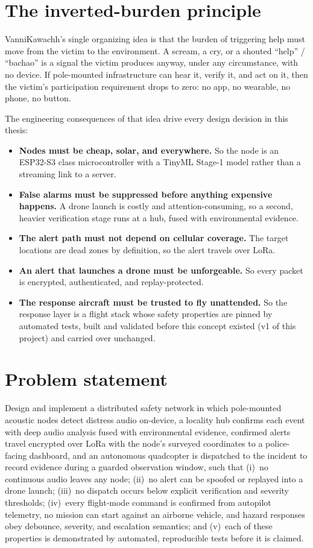 \documentclass[12pt,a4paper]{report}
\begin{document}
\section{The inverted-burden principle}
\label{sec:inverted}

VanniKawachh's single organizing idea is that the burden of triggering
help must move from the victim to the environment. A scream, a cry, or
a shouted ``help'' / ``bachao'' is a signal the victim produces
anyway, under any circumstance, with no device. If pole-mounted
infrastructure can hear it, verify it, and act on it, then the
victim's participation requirement drops to zero: no app, no
wearable, no phone, no button.

The engineering consequences of that idea drive every design decision
in this thesis:
\begin{itemize}
\item \textbf{Nodes must be cheap, solar, and everywhere.} So the
  node is an ESP32-S3 class microcontroller with a TinyML Stage-1
  model rather than a streaming link to a server.
\item \textbf{False alarms must be suppressed before anything
  expensive happens.} A drone launch is costly and
  attention-consuming, so a second, heavier verification stage runs
  at a hub, fused with environmental evidence.
\item \textbf{The alert path must not depend on cellular coverage.}
  The target locations are dead zones by definition, so the alert
  travels over LoRa.
\item \textbf{An alert that launches a drone must be unforgeable.} So
  every packet is encrypted, authenticated, and replay-protected.
\item \textbf{The response aircraft must be trusted to fly
  unattended.} So the response layer is a flight stack whose safety
  properties are pinned by automated tests, built and validated
  before this concept existed (v1 of this project) and carried over
  unchanged.
\end{itemize}

\section{Problem statement}
\label{sec:problem}

Design and implement a distributed safety network in which
pole-mounted acoustic nodes detect distress audio on-device, a
locality hub confirms each event with deep audio analysis fused with
environmental evidence, confirmed alerts travel encrypted over LoRa
with the node's surveyed coordinates to a police-facing dashboard, and
an autonomous quadcopter is dispatched to the incident to record
evidence during a guarded observation window, such that (i)~no continuous
audio leaves any node; (ii)~no alert can be spoofed or replayed into a
drone launch; (iii)~no dispatch occurs below explicit verification and
severity thresholds; (iv)~every flight-mode command is confirmed from
autopilot telemetry, no mission can start against an airborne vehicle,
and hazard responses obey debounce, severity, and escalation
semantics; and (v)~each of these properties is demonstrated by
automated, reproducible tests before it is claimed.
\end{document}
